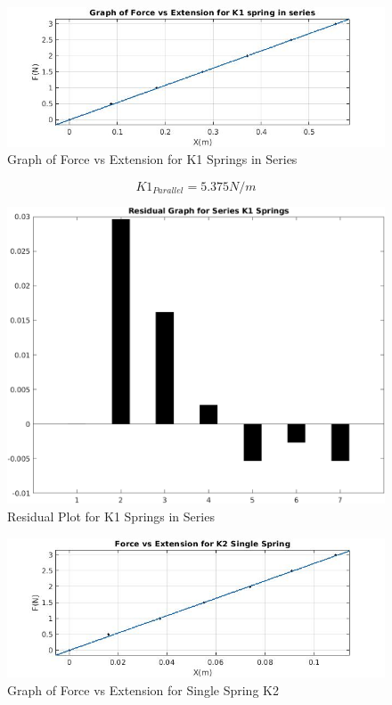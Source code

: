 \begin{center}
\begin{figure}[h!]
    \centering
    \includegraphics[width=\textwidth]{figures/K1_S_se.jpg}
    \caption{Graph of Force vs Extension for K1 Springs in Series}
    \label{fig:k1_S_se}
\end{figure}
\end{center}
$$ K1_{Parallel} = 5.375 N/m $$
\newpage
\begin{center}
\begin{figure}[h!]
    \centering
    \includegraphics[width=\textwidth]{figures/K1_Se_R.png}
    \caption{Residual Plot for K1 Springs in Series}
    \label{fig:k1_Se_R}
\end{figure}
\end{center}


\begin{center}
\begin{figure}[h!]
    \centering
    \includegraphics[width=\textwidth]{figures/K2_Single.jpg}
    \caption{Graph of Force vs Extension for Single Spring K2}
    \label{fig:k1_Se_R}
\end{figure}
\end{center}

